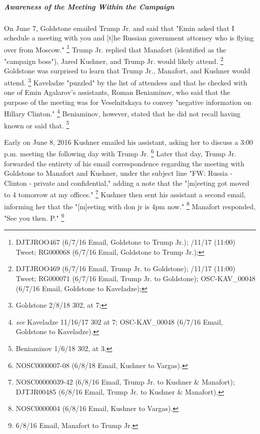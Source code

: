 \subparagraph{Awareness of the Meeting Within the Campaign}

On June 7, Goldstone emailed Trump Jr. and said that "Emin asked that I schedule a meeting with you and [t]he Russian government attorney who is flying over from Moscow."%
\footnote{DJTJROO467 (6/7/16 Email, Goldstone to Trump Jr.);
/11/17 (11:00) Tweet;
RG000068 (6/7/16 Email, Goldstone to Trump Jr.);
}
Trump Jr. replied that Manafort (identified as the "campaign boss"), Jared Kushner, and Trump Jr. would likely attend.%
\footnote{DJTJROO469 (6/7/16 Email, Trump Jr. to Goldstone);
/11/17 (11:00) Tweet;
RG000071 (6/7/16 Email, Trump Jr. to Goldstone);
OSC-KAV\_00048 (6/7/16 Email, Goldstone to Kaveladze);
}
Goldstone was surprised to learn that Trump Jr., Manafort, and Kushner would attend.%
\footnote{Goldstone 2/8/18 302, at 7;
}
Kaveladze 
"puzzled" by the list of attendees and that he checked with one of Emin Agalarov's assistants, Roman Beniaminov, who said that the purpose of the meeting was for Veselnitskaya to convey "negative information on Hillary Clinton."%
\footnote{ \textit{see} Kaveladze 11/16/17 302 at 7;
OSC-KAV\_00048 (6/7/16 Email, Goldstone to Kaveladze).}
Beniaminov, however, stated that he did not recall having known or said that.%
\footnote{Beniaminov 1/6/18 302, at 3.}

Early on June 8, 2016 Kushner emailed his assistant, asking her to discuss a 3:00 p.m. meeting the following day with Trump Jr.%
\footnote{NOSC0000007-08 (6/8/18 Email, Kushner to Vargas).}
Later that day, Trump Jr. forwarded the entirety of his email correspondence regarding the meeting with Goldstone to Manafort and Kushner, under the subject line "FW: Russia - Clinton - private and confidential," adding a note that the "[m]eeting got moved to 4 tomorrow at my offices."%
\footnote{NOSC00000039-42 (6/8/16 Email, Trump Jr. to Kushner \& Manafort);
DJTJR00485 (6/8/16 Email, Trump Jr. to Kushner \& Manafort).}
Kushner then sent his assistant a second email, informing her that the "[m]eeting with don jr is 4pm now."%
\footnote{NOSC0000004 (6/8/16 Email, Kushner to Vargas).}
Manafort responded, "See you then. P."%
\footnote{6/8/16 Email, Manafort to Trump Jr.}

